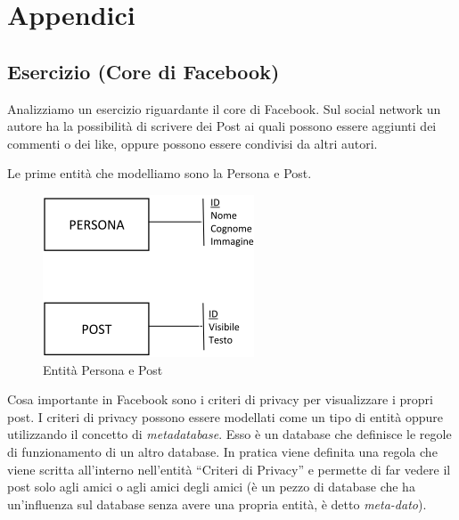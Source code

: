 
\chapter{Appendici}
\label{cap:appendix}

\section{Esercizio (Core di Facebook)}

Analizziamo un esercizio riguardante il core di Facebook. Sul social network un autore ha la possibilità di scrivere dei Post ai quali possono essere aggiunti dei commenti o dei like, oppure possono essere condivisi da altri autori.  

Le prime entità che modelliamo sono la Persona e Post. 

\begin{center}
\begin{figure}[H]
\centering
\includegraphics[scale=1]{figures/persona_post.png}
\caption{Entità Persona e Post}
\end{figure}
\end{center}

Cosa importante in Facebook sono i criteri di privacy per visualizzare i propri post. I criteri di privacy possono essere modellati come un tipo di entità oppure utilizzando il concetto di \textit{metadatabase}. Esso è un database che definisce le regole di funzionamento di un altro database. In pratica viene definita una regola che viene scritta all’interno nell’entità “Criteri di Privacy” e permette di far vedere il post solo agli amici o agli amici degli amici (è un pezzo di database che ha un’influenza sul database senza avere una propria entità, è detto \textit{meta-dato}).
  
